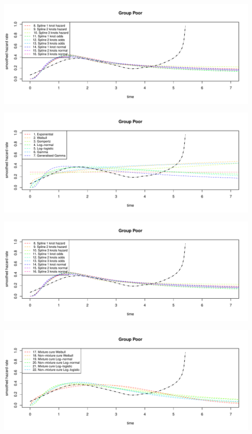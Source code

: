 \documentclass[]{article}
\begin{document}
\begin{flushleft}\includegraphics[height=0.29\textheight]{Images/plot_haz_pred-6} \end{flushleft}

\begin{flushleft}\includegraphics[height=0.29\textheight]{Images/plot_haz_pred-7} \end{flushleft}

\begin{flushleft}\includegraphics[height=0.29\textheight]{Images/plot_haz_pred-8} \end{flushleft}

\begin{flushleft}\includegraphics[height=0.29\textheight]{Images/plot_haz_pred-9} \end{flushleft}
\end{document}
